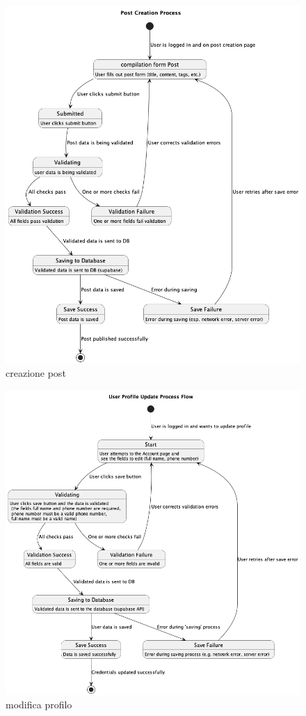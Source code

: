 \documentclass{article}
\begin{document}
\begin{figure}[h]
    \lefting
    \includegraphics[width=1.3\textwidth]{creazione_post_flow}
    \caption{creazione post}
    \label{fig:figure3}
\end{figure}

\begin{figure}[h]
    \lefting
    \includegraphics[width=1.3\textwidth]{modifica_profilo_flow}
    \caption{modifica profilo}
    \label{fig:figure2}
\end{figure}
\end{document}
